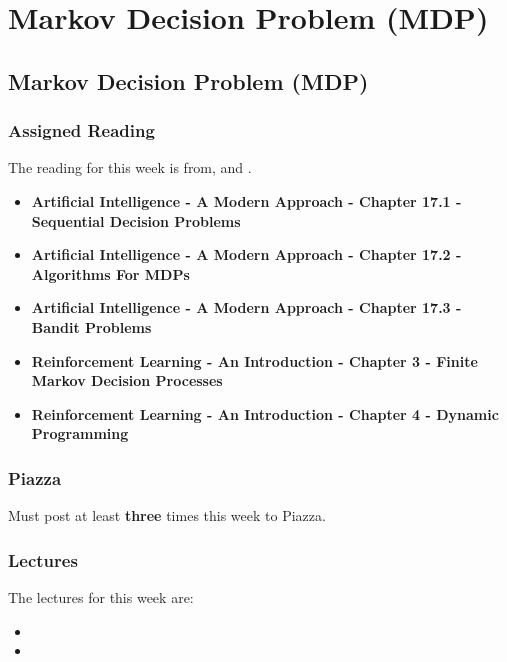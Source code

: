 \clearpage

\renewcommand{\ChapTitle}{Markov Decision Problem (MDP)}
\renewcommand{\SectionTitle}{Markov Decision Problem (MDP)}

\chapter{\ChapTitle}

\section{\SectionTitle}

\subsection{Assigned Reading}

The reading for this week is from, \AITextbook \hspace*{1pt} and \RLTextbook.

\begin{itemize}
    \item \textbf{Artificial Intelligence - A Modern Approach - Chapter 17.1 - Sequential Decision Problems}
    \item \textbf{Artificial Intelligence - A Modern Approach - Chapter 17.2 - Algorithms For MDPs}
    \item \textbf{Artificial Intelligence - A Modern Approach - Chapter 17.3 - Bandit Problems}
    \item \textbf{Reinforcement Learning - An Introduction - Chapter 3 - Finite Markov Decision Processes}
    \item \textbf{Reinforcement Learning - An Introduction - Chapter 4 - Dynamic Programming}
\end{itemize}

\subsection{Piazza}

Must post at least \textbf{three} times this week to Piazza.

\subsection{Lectures}

The lectures for this week are:

\begin{itemize}
    \item {}
    \item {}
\end{itemize}

